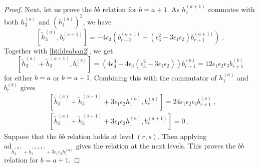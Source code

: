 \documentclass[11pt]{article}
\numberwithin{equation}{section}
\numberwithin{figure}{section}
\numberwithin{table}{section}
\begin{document}
\begin{proof}
	Next, let us prove the $bb$ relation for $b=a+1$. As $h^{(a+1)}_1$ commutes with both $h^{(a)}_3$ and $\left(h^{(a)}_1\right)^2$, we have
	\begin{equation}
		\left[\widetilde{h}^{(a)}_3,b^{(a+1)}_r\right]=-4\epsilon_3\left(b^{(a+1)}_{r+3}+\left(\epsilon_3^2-3\epsilon_1\epsilon_2\right)b^{(a+1)}_{r+1}\right)\;.
	\end{equation}
	Together with \eqref{htildeaban2}, we get
	\begin{equation}
		\left[\widetilde{h}^{(a)}_3+\widetilde{h}^{(a+1)}_3,b^{(b)}_r\right]=\left(4\epsilon_3^3-4\epsilon_3(\epsilon_3^2-3\epsilon_1\epsilon_2)\right)b^{(b)}_{r+1}=12\epsilon_1\epsilon_2\epsilon_3b^{(b)}_{r+1}
	\end{equation}
	for either $b=a$ or $b=a+1$. Combining this with the commutator of $h^{(a)}_1$ and $b^{(b)}_r$ gives
	\begin{subequations}
		\begin{align}
		&\left[\widetilde{h}^{(a)}_3+\widetilde{h}^{(a+1)}_3+3\epsilon_1\epsilon_2h^{(a)}_1,b^{(a)}_r\right]=24\epsilon_1\epsilon_2\epsilon_3b^{(a)}_{r+1}\;,\\
		&\left[\widetilde{h}^{(a)}_3+\widetilde{h}^{(a+1)}_3+3\epsilon_1\epsilon_2h^{(a)}_1,b^{(a+1)}_r\right]=0\;.
	\end{align}
	\end{subequations}
	Suppose that the $bb$ relation holds at level $(r,s)$. Then applying $\mathrm{ad}_{\widetilde{h}^{(a)}_3+\widetilde{h}^{(a+1)}_3+3\epsilon_1\epsilon_2h^{(a)}_1}$ gives the relation at the next levels. This proves the $bb$ relation for $b=a+1$.


\end{proof}
\end{document}
